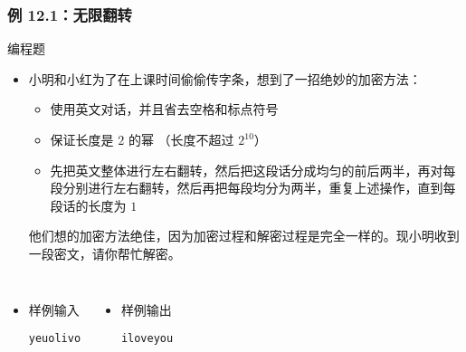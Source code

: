 \begin{frame}[fragile]
    \frametitle{例 12.1：无限翻转}
     {
        \begin{exampleblock}{编程题}
            \begin{itemize}
                \item 小明和小红为了在上课时间偷偷传字条，想到了一招绝妙的加密方法： \\
                    \begin{itemize}
                        \item 使用英文对话，并且省去空格和标点符号
                        \item 保证长度是 $2$ 的幂 （长度不超过 $2^{10}$）
                        \item 先把英文整体进行左右翻转，然后把这段话分成均匀的前后两半，再对每段分别进行左右翻转，然后再把每段均分为两半，重复上述操作，直到每段话的长度为 $1$
                    \end{itemize}
                    他们想的加密方法绝佳，因为加密过程和解密过程是完全一样的。现小明收到一段密文，请你帮忙解密。
            \end{itemize}
            
            \begin{columns}

                \begin{itemize}
                \item 样例输入
    
                    \lstinline|yeuolivo|     
                \end{itemize}

                \begin{itemize}
                \item 样例输出
                
                    \lstinline|iloveyou| 
                \end{itemize}
            \end{columns}

        \end{exampleblock}
    }
\end{frame}
